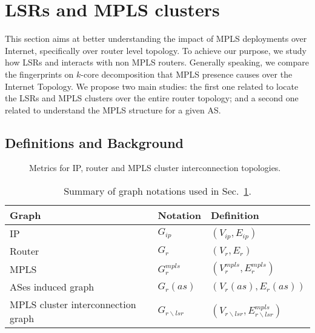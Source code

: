 \section{LSRs and MPLS clusters}\label{cluster}
This section aims at better
understanding the impact of MPLS deployments over Internet, specifically over
router level topology. To achieve our purpose, we study how LSRs and  
interacts  with non MPLS routers. Generally speaking, we compare the fingerprints  on $k$-core 
decomposition that MPLS presence causes over the Internet Topology. We propose two main studies: the
first one related to locate the LSRs and MPLS clusters over the entire router topology; and a second
one related to understand the MPLS structure for a given AS.

\subsection{Definitions and Background}\label{cluster.methodo}
\begin{figure*}[!htb]
  \begin{center}
    \hfil
    \hfil
  \end{center}
\caption{Metrics for IP, router and MPLS cluster interconnection
topologies.} 
\label{fig_metrics}
\end{figure*}

\begin{table}[!t]
  \begin{center}
    \begin{tabular}{l|ll}
    \textbf{Graph} & \textbf{Notation} & \textbf{Definition}\\
    \hline
    IP                 & $G_{ip}$ & $(V_{ip}, E_{ip})$\\
    Router             & $G_r$ & $(V_r, E_r)$\\    
    MPLS               & $G_r^{mpls}$ & $(V_r^{mpls}, E_r^{mpls})$\\
    ASes induced graph & $G_r(as)$ & $(V_r(as), E_r(as))$\\    
    MPLS cluster interconnection graph & $G_{r \backslash lsr}$ & $(V_{r
    \backslash lsr}, E_{r \backslash lsr}^{mpls})$
    \end{tabular}
  \end{center}
  \caption{Summary of graph notations used in Sec.~\ref{cluster}.}
  \label{cluster.table_notations}
\end{table}


